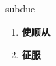 
\begin{frame}
{\huge subdue}
\begin{center}
\begin{enumerate}\Large
  \item \textbf{使顺从}
  \item \textbf{征服}
\end{enumerate}
\end{center}
\end{frame}
